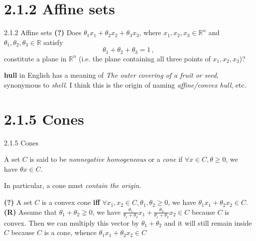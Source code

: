 \documentclass{beamer}
\begin{document}
\section{2.1.2 Affine sets}
\begin{frame}{2.1.2 Affine sets}
  \textbf{(?)} Does $\theta_{1} x_{1} + \theta_{2} x_{2} + \theta_{3} x_{3}$, where $x_{1}, x_{2}, x_{3} \in \mathbb{R}^{n}$
  and $\theta_{1}, \theta_{2}, \theta_{3} \in \mathbb{R}$ satisfy
  $$
    \theta_{1} + \theta_{2} + \theta_{3} = 1\,,
  $$
  constitute a plane in $\mathbb{R}^{n}$ (i.e. the plane containing all three points of $x_{1}, x_{2}, x_{3}$)?


  \textbf{hull} in English has a meaning of \textit{The outer covering of a fruit or seed}, synonymous to \textit{shell}.
  I think this is the origin of naming \textit{affine/convex hull}, etc.
\end{frame}


\section{2.1.5 Cones}
\begin{frame}{2.1.5 Cones}
  \begin{definition}
    A set $C$ is said to be \textit{nonnegative homogeneous} or a \textit{cone} if $\forall x \in C, \theta \ge 0$, we
    have $\theta x \in C$.
  \end{definition}

  In particular, a cone must \textit{contain the origin}.

    \textbf{(?)} A set $C$ is a convex cone \textbf{iff} $\forall x_{1}, x_{2} \in C, \theta_{1}, \theta_{2} \ge 0$, we have
    $\theta_{1}x_{1} + \theta_{2}x_{2} \in C$.\\
    \textbf{(R)} Assume that $\theta_{1} + \theta_{2} \gneq 0$, we have
    $
      \frac{\theta_{1}}{\theta_{1} + \theta_{2}} x_{1}
      + \frac{\theta_{2}}{\theta_{1} + \theta_{2}} x_{2} \in C
    $ because $C$ is convex. Then we can multiply this vector by $\theta_{1} + \theta_{2}$ and
    it will still remain inside $C$ because $C$ is a cone, whence $\theta_{1}x_{1} + \theta_{2}x_{2} \in C$
\end{frame}
\end{document}
